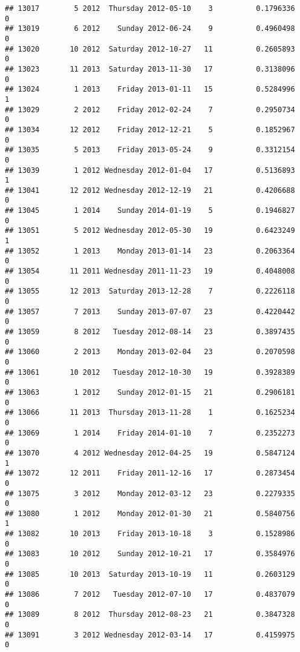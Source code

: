 \documentclass[
]{article}
\begin{document}
\begin{verbatim}
## 13017        5 2012  Thursday 2012-05-10    3          0.1796336             0
## 13019        6 2012    Sunday 2012-06-24    9          0.4960498             0
## 13020       10 2012  Saturday 2012-10-27   11          0.2605893             0
## 13023       11 2013  Saturday 2013-11-30   17          0.3138096             0
## 13024        1 2013    Friday 2013-01-11   15          0.5284996             1
## 13029        2 2012    Friday 2012-02-24    7          0.2950734             0
## 13034       12 2012    Friday 2012-12-21    5          0.1852967             0
## 13035        5 2013    Friday 2013-05-24    9          0.3312154             0
## 13039        1 2012 Wednesday 2012-01-04   17          0.5136893             1
## 13041       12 2012 Wednesday 2012-12-19   21          0.4206688             0
## 13045        1 2014    Sunday 2014-01-19    5          0.1946827             0
## 13051        5 2012 Wednesday 2012-05-30   19          0.6423249             1
## 13052        1 2013    Monday 2013-01-14   23          0.2063364             0
## 13054       11 2011 Wednesday 2011-11-23   19          0.4048008             0
## 13055       12 2013  Saturday 2013-12-28    7          0.2226118             0
## 13057        7 2013    Sunday 2013-07-07   23          0.4220442             0
## 13059        8 2012   Tuesday 2012-08-14   23          0.3897435             0
## 13060        2 2013    Monday 2013-02-04   23          0.2070598             0
## 13061       10 2012   Tuesday 2012-10-30   19          0.3928389             0
## 13063        1 2012    Sunday 2012-01-15   21          0.2906181             0
## 13066       11 2013  Thursday 2013-11-28    1          0.1625234             0
## 13069        1 2014    Friday 2014-01-10    7          0.2352273             0
## 13070        4 2012 Wednesday 2012-04-25   19          0.5847124             1
## 13072       12 2011    Friday 2011-12-16   17          0.2873454             0
## 13075        3 2012    Monday 2012-03-12   23          0.2279335             0
## 13080        1 2012    Monday 2012-01-30   21          0.5840756             1
## 13082       10 2013    Friday 2013-10-18    3          0.1528986             0
## 13083       10 2012    Sunday 2012-10-21   17          0.3584976             0
## 13085       10 2013  Saturday 2013-10-19   11          0.2603129             0
## 13086        7 2012   Tuesday 2012-07-10   17          0.4837079             0
## 13089        8 2012  Thursday 2012-08-23   21          0.3847328             0
## 13091        3 2012 Wednesday 2012-03-14   17          0.4159975             0

\end{verbatim}
\end{document}
